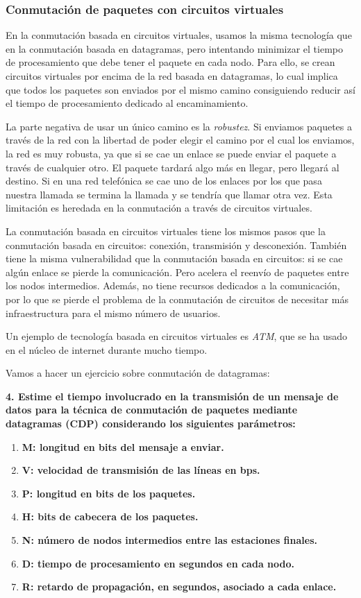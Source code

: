 \documentclass[10pt,a4paper,spanish]{report}
\begin{document}
\subsubsection{\textcolor{tema4}Conmutación de paquetes con circuitos virtuales}
En la conmutación basada en circuitos virtuales, usamos la misma tecnología que en la conmutación basada en datagramas, pero intentando minimizar el tiempo de procesamiento que debe tener el paquete en cada nodo. Para ello, se crean circuitos virtuales por encima de la red basada en datagramas, lo cual implica que todos los paquetes son enviados por el mismo camino consiguiendo reducir así el tiempo de procesamiento dedicado al encaminamiento.

La parte negativa de usar un único camino es la \textit{\textcolor{tema4}{robustez}}. Si enviamos paquetes a través de la red con la libertad de poder elegir el camino por el cual los enviamos, la red es muy robusta, ya que si se cae un enlace se puede enviar el paquete a través de cualquier otro. El paquete tardará algo más en llegar, pero llegará al destino. Si en una red telefónica se cae uno de los enlaces por los que pasa nuestra llamada se termina la llamada y se tendría que llamar otra vez. Esta limitación es heredada en la conmutación a través de circuitos virtuales. 

La conmutación basada en circuitos virtuales tiene los mismos pasos que la conmutación basada en circuitos: conexión, transmisión y desconexión. También tiene la misma vulnerabilidad que la conmutación basada en circuitos: si se cae algún enlace se pierde la comunicación. Pero acelera el reenvío de paquetes entre los nodos intermedios. Además, no tiene recursos dedicados a la comunicación, por lo que se pierde el problema de la conmutación de circuitos de necesitar más infraestructura para el mismo número de usuarios.

Un ejemplo de tecnología basada en circuitos virtuales es \textit{\textcolor{tema4}{ATM}}, que se ha usado en el núcleo de internet durante mucho tiempo.

Vamos a hacer un ejercicio sobre conmutación de datagramas:

\textbf{4. Estime el tiempo involucrado en la transmisión de un mensaje de datos para la técnica de conmutación de paquetes mediante datagramas (CDP) considerando los siguientes parámetros:}
\begin{enumerate}[---]
  \item \textbf{M: longitud en bits del mensaje a enviar.}
  \item \textbf{V: velocidad de transmisión de las líneas en bps.}
  \item \textbf{P: longitud en bits de los paquetes.}
  \item \textbf{H: bits de cabecera de los paquetes.}
  \item \textbf{N: número de nodos intermedios entre las estaciones finales.}
  \item \textbf{D: tiempo de procesamiento en segundos en cada nodo.}
  \item \textbf{R: retardo de propagación, en segundos, asociado a cada enlace.}
\end{enumerate}
 
\end{document}
